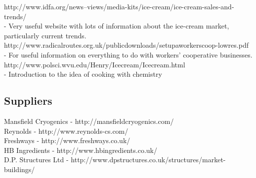 \documentclass{article}
\begin{document}
http://www.idfa.org/news--views/media-kits/ice-cream/ice-cream-sales-and-trends/ \\
 - Very useful website with lots of information about the ice-cream market, particularly current trends. \\

http://www.radicalroutes.org.uk/publicdownloads/setupaworkerscoop-lowres.pdf \\
 - For useful information on everything to do with workers' cooperative businesses. \\

http://www.polsci.wvu.edu/Henry/Icecream/Icecream.html \\
 - Introduction to the idea of cooking with chemistry

\subsection{Suppliers}

Mansfield Cryogenics - http://mansfieldcryogenics.com/ \\

Reynolds - http://www.reynolds-cs.com/ \\

Freshways - http://www.freshways.co.uk/ \\

HB Ingredients - http://www.hbingredients.co.uk/ \\

D.P. Structures Ltd - http://www.dpstructures.co.uk/structures/market-buildings/
\end{document}
